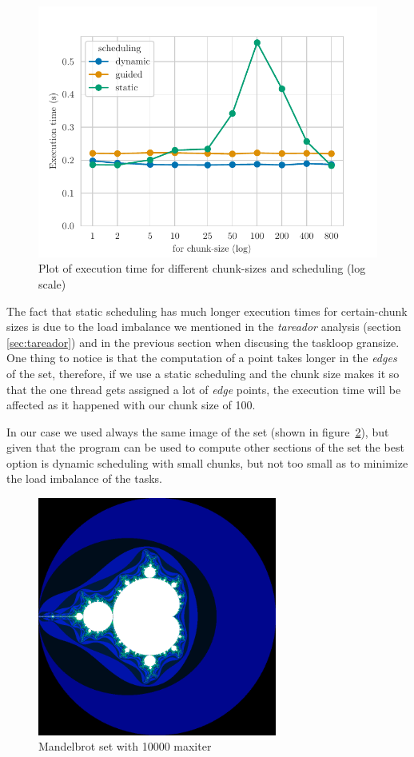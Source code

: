 \begin{figure}[H]
    \centering
    \includegraphics{plots/for-scheduling_log.pdf}
    \caption{Plot of execution time for different chunk-sizes and scheduling (log scale)}
    \label{fig:for_log} 
\end{figure}

The fact that static scheduling has much longer execution times for certain-chunk sizes is due to the load imbalance
we mentioned in the \emph{tareador} analysis (section \ref{sec:tareador}) and in the previous section when
discusing the taskloop gransize.
One thing to notice is that the computation of a point takes longer in the \emph{edges}
of the set, therefore, if we use a static scheduling and the chunk size makes it so that the one thread gets assigned
a lot of \emph{edge} points, the execution time will be affected as it happened with our chunk size of 100. 

In our case we used always the same image of the set (shown in figure~\ref{fig:set}), but given that the program can be
used to compute other sections of the set the best option is dynamic scheduling with small chunks, but not too small
as to minimize the load imbalance of the tasks.

\begin{figure}[H]
    \centering
    \includegraphics[width=0.7\textwidth]{images/set.png}
    \caption{Mandelbrot set with 10000 maxiter}
    \label{fig:set} 
\end{figure}

